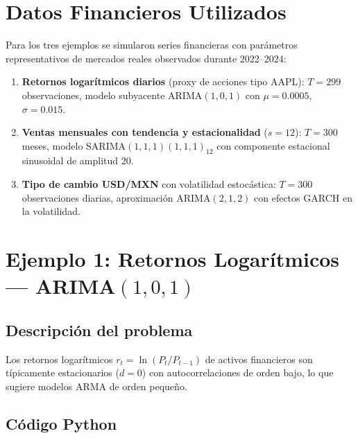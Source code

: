 \documentclass[12pt,a4paper]{article}
\begin{document}
\section{Datos Financieros Utilizados}

Para los tres ejemplos se simularon series financieras con par{\'a}metros representativos
de mercados reales observados durante 2022--2024:

\begin{enumerate}[label=\arabic*.]
  \item \textbf{Retornos logar{\'i}tmicos diarios} (proxy de acciones tipo AAPL):
        $T=299$ observaciones, modelo subyacente ARIMA$(1,0,1)$ con
        $\mu=0.0005$, $\sigma=0.015$.
  \item \textbf{Ventas mensuales con tendencia y estacionalidad} ($s=12$):
        $T=300$ meses, modelo SARIMA$(1,1,1)(1,1,1)_{12}$ con componente
        estacional sinusoidal de amplitud 20.
  \item \textbf{Tipo de cambio USD/MXN} con volatilidad estoc{\'a}stica:
        $T=300$ observaciones diarias, aproximaci{\'o}n ARIMA$(2,1,2)$ con
        efectos GARCH en la volatilidad.
\end{enumerate}

\section{Ejemplo 1: Retornos Logar{\'i}tmicos --- ARIMA\texorpdfstring{$(1,0,1)$}{(1,0,1)}}

\subsection{Descripci{\'o}n del problema}

Los retornos logar{\'i}tmicos $r_t = \ln(P_t/P_{t-1})$ de activos financieros son t{\'i}picamente
estacionarios ($d=0$) con autocorrelaciones de orden bajo, lo que sugiere modelos ARMA
de orden peque{\~n}o.

\subsection{C{\'o}digo Python}
\end{document}
